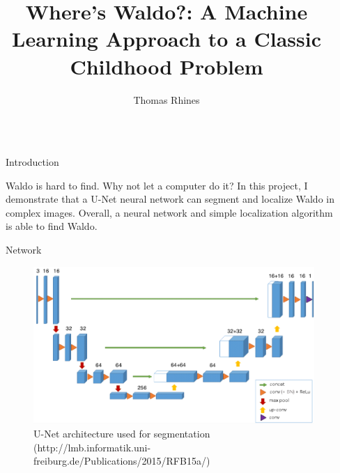 \documentclass[final]{beamer}
\title{Where's Waldo?: A Machine Learning Approach to a Classic Childhood Problem} %
\author{Thomas Rhines} %
\institute{https://github.com/tjrhines/Final\_Public} %
\newlength{\sepwid}
\newlength{\onecolwid}
\begin{document}

\setlength{\belowcaptionskip}{2ex} %
\setlength\belowdisplayshortskip{2ex} %

\begin{frame}[t] %

\begin{columns}[t] %

\begin{column}{\sepwid}\end{column} %

\begin{column}{\onecolwid} %

\begin{alertblock}{Introduction}

Waldo is hard to find. Why not let a computer do it? In this project, I demonstrate that a U-Net neural network can segment and localize Waldo in complex images. Overall, a neural network and simple localization algorithm is able to find Waldo.

\end{alertblock}

\begin{block}{Network}

\begin{figure}
    \includegraphics[width=1.05\textwidth]{pictures/unet.png}
    \caption{U-Net architecture used for segmentation (http://lmb.informatik.uni-freiburg.de/Publications/2015/RFB15a/)}
    \label{fig:unet}
\end{figure}


\end{block}
\end{column}
\end{columns}
\end{frame}
\end{document}
